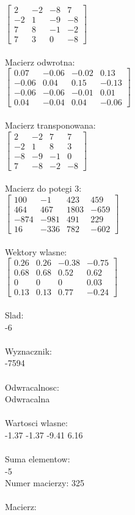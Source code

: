 \documentclass[a4paper,12pt]{article}
\begin{document}
$\begin{bmatrix} 2&-2&-8&7\\-2&1&-9&-8\\7&8&-1&-2\\7&3&0&-8 \end{bmatrix}$
\\
\\
Macierz odwrotna:\\

$\begin{bmatrix} 0.07&-0.06&-0.02&0.13\\-0.06&0.04&0.15&-0.13\\-0.06&-0.06&-0.01&0.01\\0.04&-0.04&0.04&-0.06 \end{bmatrix}$
\\
\\
Macierz transponowana:\\

$\begin{bmatrix} 2&-2&7&7\\-2&1&8&3\\-8&-9&-1&0\\7&-8&-2&-8 \end{bmatrix}$
\\
\\
Macierz do potegi 3:\\

$\begin{bmatrix} 100&-1&423&459\\464&467&1803&-659\\-874&-981&491&229\\16&-336&782&-602 \end{bmatrix}$
\\
\\
Wektory wlasne:\\

$\begin{bmatrix} 0.26&0.26&-0.38&-0.75\\0.68&0.68&0.52&0.62\\0&0&0&0.03\\0.13&0.13&0.77&-0.24 \end{bmatrix}$
\\
\\
Slad:\\
-6
\\
\\
Wyznacznik:\\
-7594
\\
\\
Odwracalnosc:\\
Odwracalna
\\
\\
Wartosci wlasne:\\
-1.37 -1.37 -9.41 6.16
\\
\\
Suma elementow:\\
-5
\\
\newpage
Numer macierzy:
325
\\
\\
Macierz:\\
\end{document}
